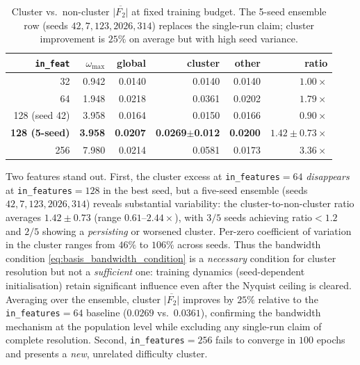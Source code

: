 \documentclass[11pt, a4paper]{article}
\theoremstyle{definition}
\theoremstyle{plain}
\begin{document}
\begin{table}[ht]
\centering
\caption{Cluster vs.\ non-cluster $\overline{|F_2|}$ at fixed
training budget. The 5-seed ensemble row (seeds $42,7,123,2026,314$)
replaces the single-run claim; cluster improvement is $25\%$ on
average but with high seed variance.}
\label{tab:basis_scaling}
\small
\begin{tabular}{rrrrrr}
\toprule
\texttt{in\_feat} & $\omega_{\max}$ & global &
  cluster & other & ratio \\
\midrule
32   & 0.942 & 0.0140 & 0.0140 & 0.0140 & $1.00\times$ \\
64   & 1.948 & 0.0218 & 0.0361 & 0.0202 & $1.79\times$ \\
128 (seed 42)  & 3.958 & 0.0164 &
  0.0150 & 0.0166 & $0.90\times$ \\
\textbf{128 (5-seed)} & \textbf{3.958} & \textbf{0.0207} &
  \textbf{0.0269}$\pm$\textbf{0.012} & \textbf{0.0200} & $\mathbf{1.42\pm0.73\times}$ \\
256  & 7.980 & 0.0214 & 0.0581 & 0.0173 & $3.36\times$ \\
\bottomrule
\end{tabular}
\end{table}

\noindent Two features stand out. First, the cluster excess
at \texttt{in\_features}$=64$ \emph{disappears} at
\texttt{in\_features}$=128$ in the best seed, but a
five-seed ensemble (seeds $42, 7, 123, 2026, 314$) reveals
substantial variability: the cluster-to-non-cluster ratio
averages $1.42\pm0.73$ (range $0.61$--$2.44\times$), with
$3/5$ seeds achieving ratio${}<1.2$ and $2/5$ showing a
\emph{persisting} or worsened cluster. Per-zero coefficient
of variation in the cluster ranges from $46\%$ to $106\%$
across seeds. Thus the bandwidth condition
\eqref{eq:basis_bandwidth_condition} is a \emph{necessary}
condition for cluster resolution but not a \emph{sufficient}
one: training dynamics (seed-dependent initialisation) retain
significant influence even after the Nyquist ceiling is
cleared. Averaging over the ensemble, cluster
$\overline{|F_2|}$ improves by $25\%$ relative to the
\texttt{in\_features}$=64$ baseline ($0.0269$ vs.\ $0.0361$),
confirming the bandwidth mechanism at the population level
while excluding any single-run claim of complete resolution.
Second,
\texttt{in\_features}$=256$ fails to converge in $100$ epochs
and presents a \emph{new}, unrelated difficulty cluster.
\end{document}
